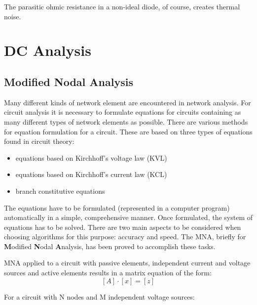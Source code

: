 \documentclass[10pt]{report}
\begin{document}
\addvspace{12pt}

The parasitic ohmic resistance in a non-ideal diode, of course,
creates thermal noise.


\chapter{DC Analysis}

\section{Modified Nodal Analysis}

Many different kinds of network element are encountered in network
analysis.  For circuit analysis it is necessary to formulate equations
for circuits containing as many different types of network elements as
possible.  There are various methods for equation formulation for a
circuit.  These are based on three types of equations found in circuit
theory:

\begin{itemize}
\item equations based on Kirchhoff's voltage law (KVL)
\item equations based on Kirchhoff's current law (KCL)
\item branch constitutive equations
\end{itemize}

The equations have to be formulated (represented in a computer
program) automatically in a simple, comprehensive manner.  Once
formulated, the system of equations has to be solved.  There are two
main aspects to be considered when choosing algorithms for this
purpose: accuracy and speed.  The MNA, briefly for \textbf{M}odified
\textbf{N}odal \textbf{A}nalysis, has been proved to accomplish these
tasks.

MNA applied to a circuit with passive elements, independent current
and voltage sources and active elements results in a matrix equation
of the form:
\begin{equation}
\left[A\right] \cdot \left[x\right] = \left[z\right]
\end{equation}

For a circuit with N nodes and M independent voltage sources:
\end{document}
